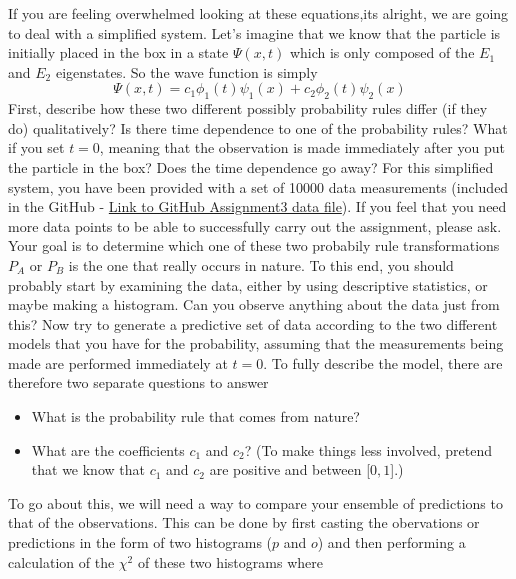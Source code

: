 \documentclass[12pt]{article}
\begin{document}
If you are feeling overwhelmed looking at these equations,its alright, we are going to deal with a simplified system.  Let's imagine that we know that the particle is initially placed in the box in a state $\Psi(x,t)$ which is only composed of the $E_1$ and $E_2$ eigenstates.  So the wave function is simply 
\begin{displaymath}
\Psi(x,t)=c_{1}\phi_{1}(t)\psi_{1}(x)+c_{2}\phi_{2}(t)\psi_{2}(x)
\end{displaymath}
First, describe how these two different possibly probability rules differ (if they do) qualitatively?  Is there time dependence to one of the probability rules?  What if you set $t=$0, meaning that the observation is made immediately after you put the particle in the box?  Does the time dependence go away?
\newline
\newline
For this simplified system, you have been provided with a set of 10000 data measurements (included in the GitHub - \href{https://github.com/smeehan12/LifeOfAParticle/tree/master/Assignments/assignment3/particle_in_a_box_v0_PerfectDetector_N10000.txt}{Link to GitHub Assignment3 data file}).  If you feel that you need more data points to be able to successfully carry out the assignment, please ask.  Your goal is to determine which one of these two probabily rule transformations $P_{A}$ or $P_{B}$ is the one that really occurs in nature.  To this end, you should probably start by examining the data, either by using descriptive statistics, or maybe making a histogram.  Can you observe anything about the data just from this?  Now try to generate a predictive set of data according to the two different models that you have for the probability, assuming that the measurements being made are performed immediately at $t=$0.  
\newline
\newline
To fully describe the model, there are therefore two separate questions to answer
\begin{itemize}[noitemsep]
\item What is the probability rule that comes from nature?
\item What are the coefficients $c_1$ and $c_2$? (To make things less involved, pretend that we know that $c_1$ and $c_2$ are positive and between [$0,1$].)
\end{itemize}
To go about this, we will need a way to compare your ensemble of predictions to that of the observations.  This can be done by first casting the obervations or predictions in the form of two histograms ($p$ and $o$) and then performing a calculation of the $\chi^{2}$ of these two histograms where
\end{document}

